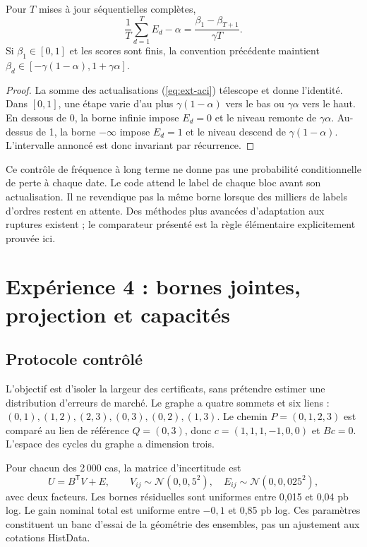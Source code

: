 \begin{proposition}
Pour \(T\) mises à jour séquentielles complètes,
\begin{equation}
 \frac1T\sum_{d=1}^TE_d-\alpha
 =\frac{\beta_1-\beta_{T+1}}{\gamma T}.
 \label{eq:ext-aci-identity}
\end{equation}
Si \(\beta_1\in[0,1]\) et les scores sont finis, la convention précédente maintient
\(\beta_d\in[-\gamma(1-\alpha),1+\gamma\alpha]\).
\end{proposition}
\begin{proof}
La somme des actualisations (\ref{eq:ext-aci}) télescope et donne l'identité. Dans \([0,1]\), une étape varie d'au plus \(\gamma(1-\alpha)\) vers le bas ou \(\gamma\alpha\) vers le haut. En dessous de 0, la borne infinie impose \(E_d=0\) et le niveau remonte de \(\gamma\alpha\). Au-dessus de 1, la borne \(-\infty\) impose \(E_d=1\) et le niveau descend de \(\gamma(1-\alpha)\). L'intervalle annoncé est donc invariant par récurrence.
\end{proof}

Ce contrôle de fréquence à long terme ne donne pas une probabilité conditionnelle de perte à chaque date. Le code attend le label de chaque bloc avant son actualisation. Il ne revendique pas la même borne lorsque des milliers de labels d'ordres restent en attente. Des méthodes plus avancées d'adaptation aux ruptures existent \cite{ext-aci-new} ; le comparateur présenté est la règle élémentaire explicitement prouvée ici.

\clearpage
\section{Expérience 4 : bornes jointes, projection et capacités}
\label{sec:ext-exp-four}

\subsection{Protocole contrôlé}

L'objectif est d'isoler la largeur des certificats, sans prétendre estimer une distribution d'erreurs de marché. Le graphe a quatre sommets et six liens : \((0,1),(1,2),(2,3),(0,3),(0,2),(1,3)\). Le chemin \(P=(0,1,2,3)\) est comparé au lien de référence \(Q=(0,3)\), donc \(c=(1,1,1,-1,0,0)\) et \(Bc=0\). L'espace des cycles du graphe a dimension trois.

Pour chacun des 2\,000 cas, la matrice d'incertitude est
\[
 U=B^{\mathsf T}V+E,\qquad V_{ij}\sim\mathcal N(0,0{,}5^2),\quad
 E_{ij}\sim\mathcal N(0,0{,}025^2),
\]
avec deux facteurs. Les bornes résiduelles sont uniformes entre 0,015 et 0,04 pb log. Le gain nominal total est uniforme entre \(-0{,}1\) et 0,85 pb log. Ces paramètres constituent un banc d'essai de la géométrie des ensembles, pas un ajustement aux cotations HistData.

